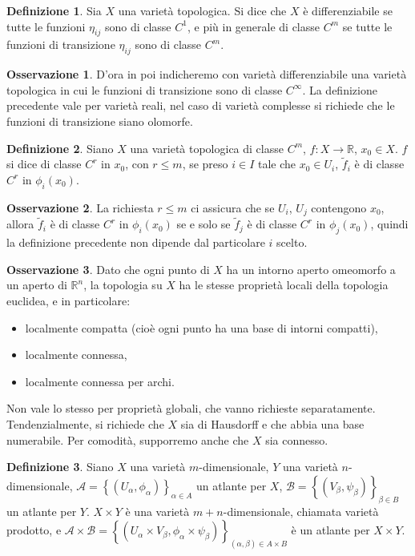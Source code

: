 \documentclass[a4paper,11pt]{article}
\theoremstyle{definition}
\newtheorem{osservazione}{Osservazione}[section]
\newtheorem{definizione}{Definizione}[section]
\theoremstyle{theorem}
\begin{document}
\begin{definizione}
	Sia $X$ una varietà topologica. Si dice che $X$ è differenziabile se tutte le funzioni $\eta_{ij}$ sono di classe $C^1$, e più in generale di classe $C^m$ se tutte le funzioni di transizione $\eta_{ij}$ sono di classe $C^m$.
\end{definizione}
\begin{osservazione}
	D'ora in poi indicheremo con varietà differenziabile una varietà topologica in cui le funzioni di transizione sono di classe $C^\infty$. La definizione precedente vale per varietà reali, nel caso di varietà complesse si richiede che le funzioni di transizione siano olomorfe.
\end{osservazione}
\begin{definizione}
	Siano $X$ una varietà topologica di classe $C^m$, $f\colon X\to\mathbb{R}$, $x_0\in X$. $f$ si dice di classe $C^r$ in $x_0$, con $r\leq m$, se preso $i\in I$ tale che $x_0\in U_i$, $\tilde{f}_i$ è di classe $C^r$ in $\phi_i(x_0)$. 
\end{definizione}
\begin{osservazione}
	La richiesta $r\leq m$ ci assicura che se $U_i$, $U_j$ contengono $x_0$, allora $\tilde{f}_i$ è di classe $C^r$ in $\phi_i(x_0)$ se e solo se $\tilde{f}_j$ è di classe $C^r$ in $\phi_j(x_0)$, quindi la definizione precedente non dipende dal particolare $i$ scelto.
\end{osservazione}
\begin{osservazione}
	Dato che ogni punto di $X$ ha un intorno aperto omeomorfo a un aperto di $\mathbb{R}^n$, la topologia su $X$ ha le stesse proprietà locali della topologia euclidea, e in particolare:
	\begin{itemize}
		\item localmente compatta (cioè ogni punto ha una base di intorni compatti),
		\item localmente connessa,
		\item localmente connessa per archi.
	\end{itemize}
	Non vale lo stesso per proprietà globali, che vanno richieste separatamente. Tendenzialmente, si richiede che $X$ sia di Hausdorff e che abbia una base numerabile. Per comodità, supporremo anche che $X$ sia connesso.
\end{osservazione}
\begin{definizione}
	Siano $X$ una varietà $m$-dimensionale, $Y$ una varietà $n$-dimensionale, $\mathcal{A}=\left\{(U_\alpha,\phi_\alpha)\right\}_{\alpha\in A}$ un atlante per $X$, $\mathcal{B}=\left\{(V_\beta,\psi_\beta)\right\}_{\beta\in B}$ un atlante per $Y$. $X\times Y$ è una varietà $m+n$-dimensionale, chiamata varietà prodotto, e $\mathcal{A}\times\mathcal{B}=\left\{(U_\alpha\times V_\beta,\phi_\alpha\times\psi_\beta)\right\}_{(\alpha,\beta)\in A\times B}$ è un atlante per $X\times Y$.
\end{definizione}
\newpage
\end{document}
